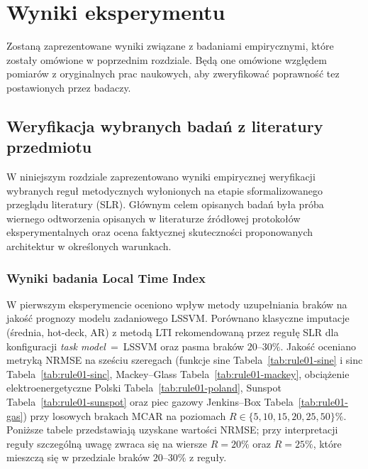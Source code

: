 \chapter{Wyniki eksperymentu}
\label{chap:Wynikieksperymentu}

Zostaną zaprezentowane wyniki związane z badaniami empirycznymi, które zostały omówione w poprzednim rozdziale. Będą one omówione względem pomiarów z oryginalnych prac naukowych, aby zweryfikować poprawność tez postawionych przez badaczy.


\section{Weryfikacja wybranych badań z literatury przedmiotu}
\label{sec:Weryfikacja}
W niniejszym rozdziale zaprezentowano wyniki empirycznej weryfikacji wybranych reguł metodycznych wyłonionych na etapie sformalizowanego przeglądu literatury (SLR). Głównym celem opisanych badań była próba wiernego odtworzenia opisanych w literaturze źródłowej protokołów eksperymentalnych oraz ocena faktycznej skuteczności proponowanych architektur w określonych warunkach.

\subsection{Wyniki badania Local Time Index}
\label{subsec:WynikiLTI}
W pierwszym eksperymencie oceniono wpływ metody uzupełniania braków na jakość prognozy modelu zadaniowego LSSVM.
Porównano klasyczne imputacje (średnia, hot-deck, AR) z metodą LTI rekomendowaną przez regułę SLR dla konfiguracji \textit{task model}~=~LSSVM oraz pasma braków $20$--$30\%$.
Jakość oceniano metryką NRMSE na sześciu szeregach (funkcje sine Tabela~\ref{tab:rule01-sine} i sinc Tabela~\ref{tab:rule01-sinc}, Mackey--Glass Tabela~\ref{tab:rule01-mackey},
obciążenie elektroenergetyczne Polski Tabela~\ref{tab:rule01-poland}, Sunspot Tabela~\ref{tab:rule01-sunspot} oraz piec gazowy Jenkins--Box Tabela~\ref{tab:rule01-gas}) przy losowych brakach MCAR na poziomach $R\in\{5,10,15,20,25,50\}\%$. Poniższe tabele przedstawiają uzyskane wartości NRMSE; przy interpretacji reguły szczególną uwagę zwraca się na wiersze $R=20\%$ oraz $R=25\%$, które mieszczą się w przedziale braków $20$--$30\%$ z reguły.


